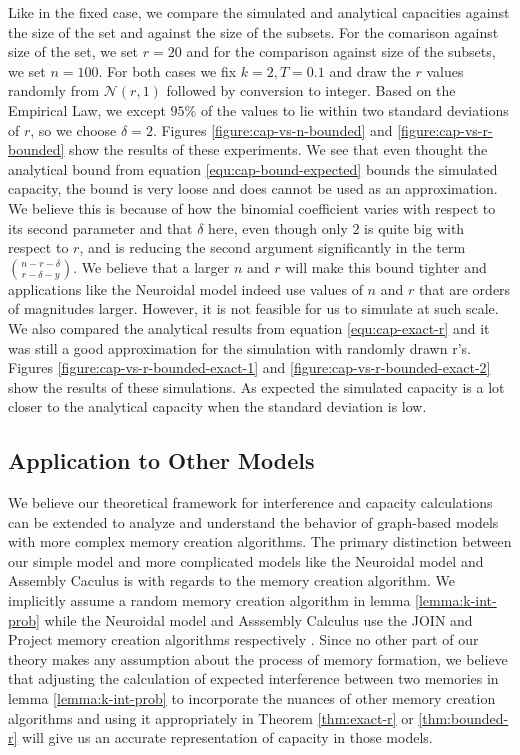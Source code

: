 Like in the fixed case, we compare the simulated and analytical capacities against the size of the set and against the size of the subsets. For the comarison against size of the set, we set $r = 20$ and for the comparison against size of the subsets, we set $n = 100$. For both cases we fix $k=2, T=0.1$ and draw the $r$ values randomly from $\mathcal{N}(r,1)$ followed by conversion to integer. Based on the Empirical Law, we except $95\%$ of the values to lie within two standard deviations of $r$, so we choose $\delta = 2$. Figures \ref{figure:cap-vs-n-bounded} and \ref{figure:cap-vs-r-bounded} show the results of these experiments. We see that even thought the analytical bound from equation \ref{equ:cap-bound-expected} bounds the simulated capacity, the bound is very loose and does cannot be used as an approximation. We believe this is because of how the binomial coefficient varies with respect to its second parameter and that $\delta$ here, even though only $2$ is quite big with respect to $r$, and is reducing the second argument significantly in the term $n - r - \delta \choose r - \delta - y$. We believe that a larger $n$ and $r$ will make this bound tighter and applications like the Neuroidal model indeed use values of $n$ and $r$ that are orders of magnitudes larger. However, it is not feasible for us to simulate at such scale. We also compared the analytical results from equation \ref{equ:cap-exact-r} and it was still a good approximation for the simulation with randomly drawn r's. Figures \ref{figure:cap-vs-r-bounded-exact-1} and \ref{figure:cap-vs-r-bounded-exact-2} show the results of these simulations. As expected the simulated capacity is a lot closer to the analytical capacity when the standard deviation is low. 

\subsection{Application to Other Models}

We believe our theoretical framework for interference and capacity calculations can be extended to analyze and understand the behavior of graph-based models with more complex memory creation algorithms. The primary distinction between our simple model and more complicated models like the Neuroidal model and Assembly Caculus is with regards to the memory creation algorithm. We implicitly assume a random memory creation algorithm in lemma \ref{lemma:k-int-prob} while the Neuroidal model and Asssembly Calculus use the JOIN and Project memory creation algorithms respectively \cite{papadimitriou2020brain} \cite{valiant2005memorization}. Since no other part of our theory makes any assumption about the process of memory formation, we believe that adjusting the calculation of expected interference between two memories in lemma \ref{lemma:k-int-prob} to incorporate the nuances of other memory creation algorithms and using it appropriately in Theorem \ref{thm:exact-r} or \ref{thm:bounded-r} will give us an accurate representation of capacity in those models.

